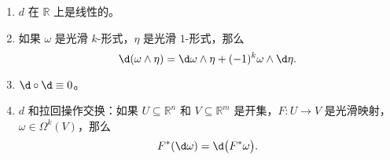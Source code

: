 \begin{proposition}
  \mbox{}
  \begin{enumerate}
    \item $d$ 在 $\mathbb{R}$ 上是线性的。
    \item 如果 $\omega$ 是光滑 $k$-形式，$\eta$ 是光滑 $1$-形式，那么
    \[
      \d(\omega\wedge\eta)=  \d\omega\wedge\eta+(-1)^k\omega\wedge\d \eta.
    \]
    \item $\d\circ\d \equiv 0$。
    \item $d$ 和拉回操作交换：如果 $U\subseteq \mathbb{R}^n$ 和 $V\subseteq \mathbb{R}^m$
    是开集，$F:U\to V$ 是光滑映射，$\omega\in\Omega^k(V)$，那么
    \begin{equation}
      F^*(\d\omega)=\d\bigl(F^*\omega\bigr).
    \end{equation}
  \end{enumerate}
\end{proposition}
